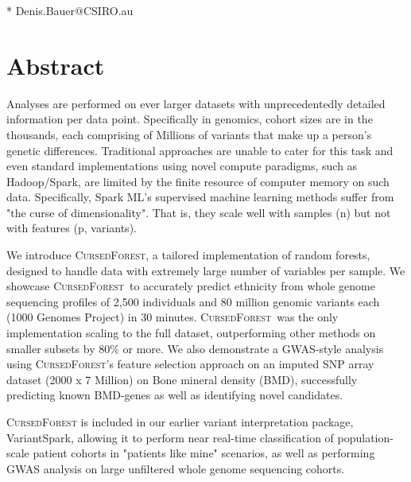 \documentclass[10pt,letterpaper]{article}
\newcommand{\cursedforest}{\textsc{CursedForest}\xspace}
\begin{document}
\begin{flushleft}



* Denis.Bauer@CSIRO.au
\end{flushleft}


\section{Abstract}

Analyses are performed on ever larger datasets with unprecedentedly detailed information per data point. Specifically in genomics, cohort sizes are in the thousands, each comprising of Millions of variants that make up a person's genetic differences. Traditional approaches are unable to cater for this task and even standard implementations using novel compute paradigms, such as Hadoop/Spark, are limited by the finite resource of computer memory on such data. Specifically, Spark ML's supervised machine learning methods suffer from "the curse of dimensionality". That is, they scale well with samples (n) but not with features (p, variants).

We introduce \cursedforest, a tailored implementation of random forests, designed to handle data with extremely large number of variables per sample. We showcase \cursedforest\ to accurately predict ethnicity from whole genome sequencing profiles of 2,500 individuals and 80 million genomic variants each (1000 Genomes Project) in 30 minutes. \cursedforest\ was the only implementation scaling to the full dataset, outperforming other methods on smaller subsets by 80\% or more. We also demonstrate a GWAS-style analysis using  \cursedforest's feature selection approach on an imputed SNP array dataset (2000 x 7 Million) on Bone mineral density (BMD), successfully predicting known BMD-genes as well as identifying novel candidates.  

\cursedforest is included in our earlier variant interpretation package, VariantSpark, allowing it to perform near real-time classification of population-scale patient cohorts in "patients like mine" scenarios, as well as performing GWAS analysis on large unfiltered whole genome sequencing cohorts. 
\end{document}
